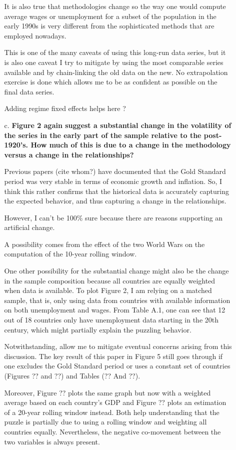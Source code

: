 \documentclass[12pt]{article}
\begin{document}
\begin{enumerate}
\begin{itemize}
It is also true that methodologies change so the way one would compute average wages or unemployment for a subset of the population in the early 1990s is very different from the sophisticated methods that are employed nowadays.

This is one of the many caveats of using this long-run data series, but it is also one caveat I try to mitigate by using the most comparable series available and by chain-linking the old data on the new. No extrapolation exercise is done which allows me to be as confident as possible on the final data series.

Adding regime fixed effects helps here ?


    \item[c.] \textbf{Figure 2 again suggest a substantial change in the volatility of the series in the early part of the sample relative to the post-1920's. How much of this is due to a change in the methodology versus a change in the relationships?}

Previous papers (cite whom?) have documented that the Gold Standard period was very stable in terms of economic growth and inflation. So, I think this rather confirms that the historical data is accurately capturing the expected behavior, and thus capturing a change in the relationships.

However, I can’t be 100\% sure because there are reasons supporting an artificial change. 

A possibility comes from the effect of the two World Wars on the computation of the 10-year rolling window.

One other possibility for the substantial change might also be the change in the sample composition because all countries are equally weighted when data is available. To plot Figure 2, I am relying on a matched sample, that is, only using data from countries with available information on both unemployment and wages. From Table A.1, one can see that 12 out of 18 countries only have unemployment data starting in the 20th century, which might partially explain the puzzling behavior.

Notwithstanding, allow me to mitigate eventual concerns arising from this discussion. The key result of this paper in Figure 5 still goes through if one excludes the Gold Standard period or uses a constant set of countries (Figures ?? and ??) and Tables (?? And ??).

Moreover, Figure ?? plots the same graph but now with a weighted average based on each country’s GDP and Figure ?? plots an estimation of a 20-year rolling window instead. Both help understanding that the puzzle is partially due to using a rolling window and weighting all countries equally. Nevertheless, the negative co-movement between the two variables is always present.



\end{itemize}
\end{enumerate}
\end{document}
